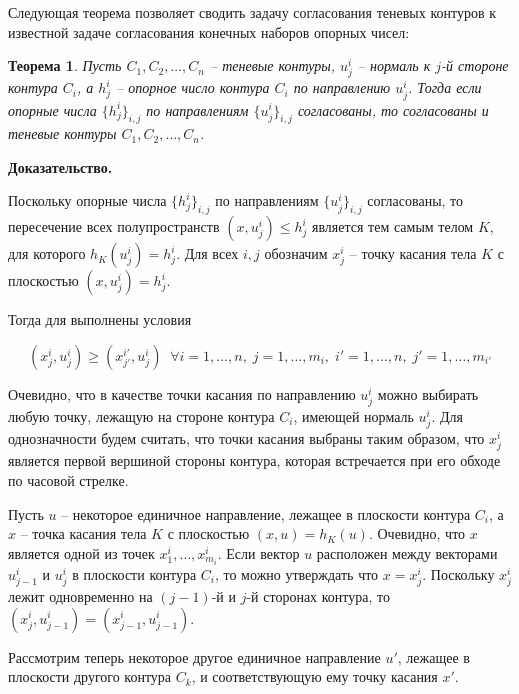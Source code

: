 \documentclass[a4paper, 10pt]{article}
\theoremstyle{definition}
\theoremstyle{plain}
\newtheorem{SmartTheorem}{Теорема}
\theoremstyle{plain}
\begin{document}
Следующая теорема позволяет сводить задачу согласования теневых контуров к
известной задаче согласования конечных наборов опорных чисел:

\begin{SmartTheorem}
 Пусть $C_{1}, C_{2}, \ldots, C_{n}$ -- теневые контуры,
 $u^{i}_{j}$ -- нормаль к $j$-й стороне контура $C_{i}$, а $h^{i}_{j}$ --
 опорное число контура $C_{i}$ по направлению $u^{i}_{j}$.
 Тогда если опорные числа $\{h^{i}_{j}\}_{i, j}$ по направлениям
 $\{u^{i}_{j}\}_{i, j}$ согласованы, то согласованы и теневые контуры
 $C_{1}, C_{2}, \ldots, C_{n}$.
\end{SmartTheorem}

\textbf{Доказательство.}

Поскольку опорные числа $\{h^{i}_{j}\}_{i, j}$ по направлениям
$\{u^{i}_{j}\}_{i, j}$ согласованы, то пересечение
всех полупространств $(x, u^{i}_{j}) \leq h^{i}_{j}$ является тем самым телом
$K$, для которого $h_{K}(u^{i}_{j}) = h^{i}_{j}$.
Для всех $i, j$ обозначим $x^{i}_{j}$ -- точку касания тела $K$ с плоскостью
$(x, u^{i}_{j}) = h^{i}_{j}$.

Тогда для выполнены условия

\begin{equation*}
 (x^{i}_{j}, u^{i}_{j}) \geq (x^{i'}_{j'}, u^{i}_{j}) \;\;
 \forall i = 1, \ldots, n, \;
 j = 1, \ldots, m_{i}, \;
 i' = 1, \ldots, n, \;
 j' = 1, \ldots, m_{i'}
\end{equation*}

Очевидно, что в качестве точки касания по направлению $u^{i}_{j}$ можно
выбирать любую точку, лежащую на стороне контура $C_{i}$, имеющей нормаль
$u^{i}_{j}$. Для однозначности будем считать, что точки касания выбраны таким
образом, что $x^{i}_{j}$ является первой вершиной стороны контура, которая
встречается при его обходе по часовой стрелке.

Пусть $u$ -- некоторое единичное направление, лежащее в плоскости контура
$C_{i}$, а $x$ -- точка касания тела $K$ с плоскостью $(x, u) = h_{K}(u)$.
Очевидно, что $x$ является одной из точек $x^{i}_{1}, \ldots, x^{i}_{m_{i}}$.
Если вектор $u$ расположен между векторами $u^{i}_{j - 1}$ и $u^{i}_{j}$ в
плоскости контура $C_{i}$, то можно утверждать что $x = x^{i}_{j}$. Поскольку
$x^{i}_{j}$ лежит одновременно на $(j - 1)$-й и $j$-й сторонах контура, то
$(x^{i}_{j}, u^{i}_{j - 1}) = (x^{i}_{j - 1}, u^{i}_{j - 1})$.

Рассмотрим теперь некоторое другое единичное направление $u'$, лежащее в
плоскости другого контура $C_{k}$, и соответствующую ему точку касания $x'$.
\end{document}
